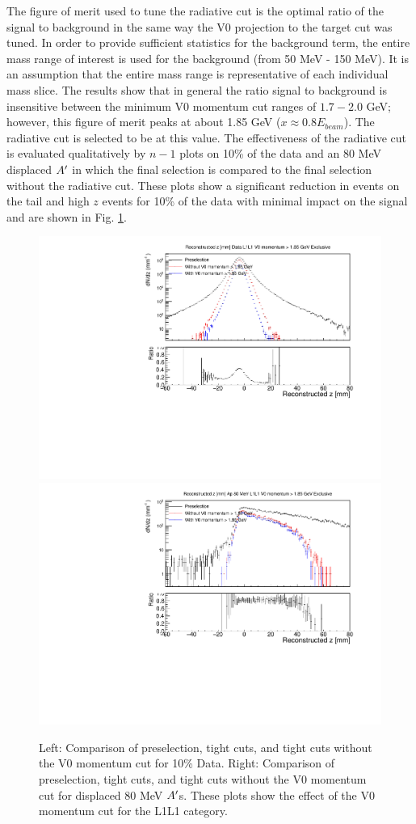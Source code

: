 The figure of merit used to tune the radiative cut is the optimal ratio of the signal to background in the same way the V0 projection to the target cut was tuned. In order to provide sufficient statistics for the background term, the entire mass range of interest is used for the background (from 50 MeV - 150 MeV). It is an assumption that the entire mass range is representative of each individual mass slice. The results show that in general the ratio signal to background is insensitive between the minimum V0 momentum cut ranges of $1.7-2.0$ GeV; however, this figure of merit peaks at about 1.85 GeV ($x\approx 0.8E_{beam}$). The radiative cut is selected to be at this value. The effectiveness of the radiative cut is evaluated qualitatively by $n-1$ plots on 10\% of the data and an 80 MeV displaced $A^\prime$ in which the final selection is compared to the final selection  without the radiative cut. These plots show a significant reduction in events on the tail and high $z$ events for 10\% of the data with minimal impact on the signal and are shown in Fig. \ref{fig:v0p_L1L1}. %

\begin{figure}[!ht] 
    \centering
    \includegraphics[width=.45\textwidth]{figs/selection/v0p_n_1_z.pdf}
    \includegraphics[width=.45\textwidth]{figs/selection/ap_80MeV_vop_n_1_z.pdf}
    \caption{
    	Left: Comparison of preselection, tight cuts, and tight cuts without the V0 momentum cut for 10\% Data. Right: Comparison of preselection, tight cuts, and tight cuts without the V0 momentum cut for displaced 80 MeV $A^\prime$s. These plots show the effect of the V0 momentum cut for the L1L1 category.
    }
    \label{fig:v0p_L1L1}
\end{figure}  

